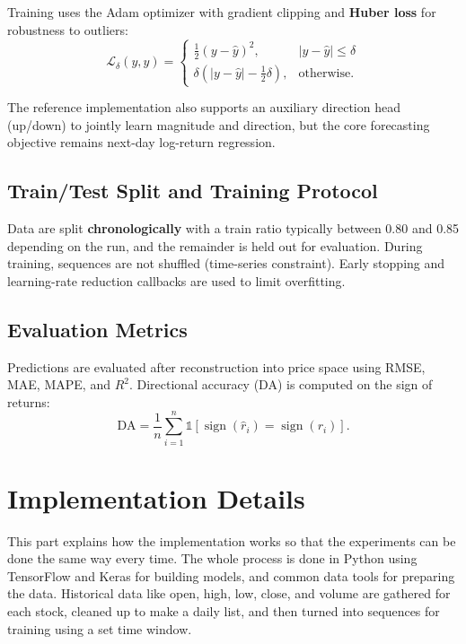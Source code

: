 \documentclass[conference]{IEEEtran}
\begin{document}
Training uses the Adam optimizer with gradient clipping and \textbf{Huber loss} for robustness to outliers:
\begin{equation}
 \mathcal{L}_\delta(y,\hat{y}) =
 \begin{cases}
 \frac{1}{2}(y-\hat{y})^2, & |y-\hat{y}| \le \delta \\
 \delta\left(|y-\hat{y}| - \frac{1}{2}\delta\right), & \text{otherwise.}
 \end{cases}
\end{equation}

The reference implementation also supports an auxiliary direction head (up/down) to jointly learn magnitude and direction, but the core forecasting objective remains next-day log-return regression.

\subsection{Train/Test Split and Training Protocol}

Data are split \textbf{chronologically} with a train ratio typically between 0.80 and 0.85 depending on the run, and the remainder is held out for evaluation. During training, sequences are not shuffled (time-series constraint). Early stopping and learning-rate reduction callbacks are used to limit overfitting.

\subsection{Evaluation Metrics}

Predictions are evaluated after reconstruction into price space using RMSE, MAE, MAPE, and $R^2$. Directional accuracy (DA) is computed on the sign of returns:
\begin{equation}
 \text{DA} = \frac{1}{n}\sum_{i=1}^{n}\mathbb{1}[\operatorname{sign}(\hat{r}_i)=\operatorname{sign}(r_i)].
\end{equation}

\section{Implementation Details}

This part explains how the implementation works so that the experiments can be done the same way every time. The whole process is done in Python using TensorFlow and Keras for building models, and common data tools for preparing the data. Historical data like open, high, low, close, and volume are gathered for each stock, cleaned up to make a daily list, and then turned into sequences for training using a set time window.
\end{document}
